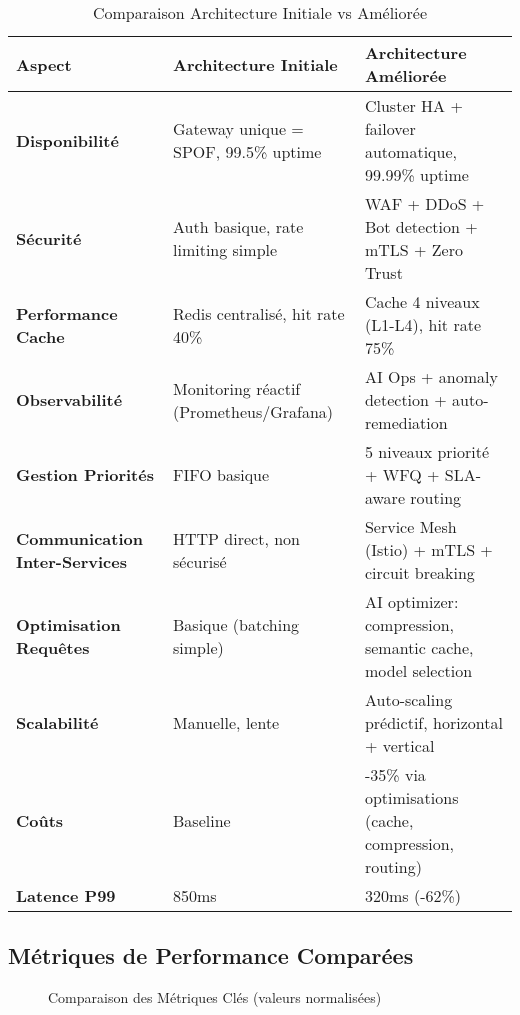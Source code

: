 \documentclass[12pt,a4paper]{article}
\begin{document}
\begin{table}[h]
\centering
\scriptsize
\begin{tabular}{|p{3.5cm}|p{4.5cm}|p{5.5cm}|}
\hline
\textbf{Aspect} & \textbf{Architecture Initiale} & \textbf{Architecture Améliorée} \\
\hline
\textbf{Disponibilité} & 
Gateway unique = SPOF, 99.5\% uptime & 
Cluster HA + failover automatique, 99.99\% uptime \\
\hline
\textbf{Sécurité} & 
Auth basique, rate limiting simple & 
WAF + DDoS + Bot detection + mTLS + Zero Trust \\
\hline
\textbf{Performance Cache} & 
Redis centralisé, hit rate 40\% & 
Cache 4 niveaux (L1-L4), hit rate 75\% \\
\hline
\textbf{Observabilité} & 
Monitoring réactif (Prometheus/Grafana) & 
AI Ops + anomaly detection + auto-remediation \\
\hline
\textbf{Gestion Priorités} & 
FIFO basique & 
5 niveaux priorité + WFQ + SLA-aware routing \\
\hline
\textbf{Communication Inter-Services} & 
HTTP direct, non sécurisé & 
Service Mesh (Istio) + mTLS + circuit breaking \\
\hline
\textbf{Optimisation Requêtes} & 
Basique (batching simple) & 
AI optimizer: compression, semantic cache, model selection \\
\hline
\textbf{Scalabilité} & 
Manuelle, lente & 
Auto-scaling prédictif, horizontal + vertical \\
\hline
\textbf{Coûts} & 
Baseline & 
-35\% via optimisations (cache, compression, routing) \\
\hline
\textbf{Latence P99} & 
850ms & 
320ms (-62\%) \\
\hline
\end{tabular}
\caption{Comparaison Architecture Initiale vs Améliorée}
\end{table}

\subsection{Métriques de Performance Comparées}

\begin{figure}[h]
\centering
{}
\caption{Comparaison des Métriques Clés (valeurs normalisées)}
\end{figure}
\end{document}
